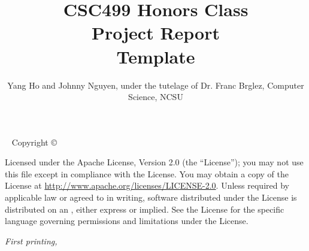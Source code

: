 \documentclass{tufte-book}
\title{CSC499 Honors Class \\Project Report \\Template}
\author[T]{Yang Ho and Johnny Nguyen, under the
tutelage of Dr. Franc Brglez, 
Computer Science, NCSU}
\begin{document}
\maketitle
\newpage
\begin{fullwidth}
~\vfill
\thispagestyle{empty}
\setlength{\parindent}{0pt}
\setlength{\parskip}{\baselineskip}
Copyright \copyright\ \the\year\ \thanklessauthor

\par{}

\par{}

\par Licensed under the Apache License, Version 2.0 (the ``License''); you may not
use this file except in compliance with the License. You may obtain a copy
of the License at \url{http://www.apache.org/licenses/LICENSE-2.0}. Unless
required by applicable law or agreed to in writing, software distributed
under the License is distributed on an , either express or implied. See the
License for the specific language governing permissions and limitations
under the License.

\par\textit{First printing, \monthyear}
\end{fullwidth}

\newpage
\end{document}
